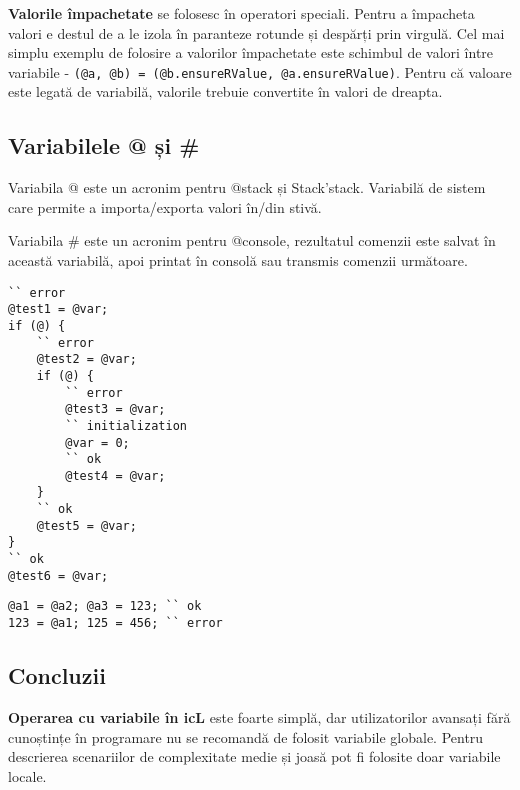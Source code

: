 {\bf Valorile împachetate} se folosesc în operatori speciali. Pentru a împacheta valori e destul de a le izola în paranteze rotunde și despărți prin virgulă. Cel mai simplu exemplu de folosire a valorilor împachetate este schimbul de valori între variabile - \lstinline|(@a, @b) = (@b.ensureRValue, @a.ensureRValue)|. Pentru că valoare este legată de variabilă, valorile trebuie convertite în valori de dreapta.

\subsection{Variabilele @ și \#}

{Variabila @} este un acronim pentru @stack și Stack'stack. Variabilă de sistem care permite a importa/exporta valori în/din stivă. 

{Variabila \#} este un acronim pentru @console, rezultatul comenzii este salvat în această variabilă, apoi printat în consolă sau transmis comenzii următoare.


\begin{lstlisting}[caption=Domeniu de vizibilitate al variabilei globale, label=globalvars]
`` error
@test1 = @var;
if (@) {
	`` error
	@test2 = @var;
	if (@) {
		`` error
		@test3 = @var;
		`` initialization
		@var = 0;
		`` ok
		@test4 = @var;
	}
	`` ok
	@test5 = @var;
}
`` ok
@test6 = @var;
\end{lstlisting}

\begin{lstlisting}[caption=Valori de stînga și dreapta, label=rlvalues]
@a1 = @a2; @a3 = 123; `` ok
123 = @a1; 125 = 456; `` error
\end{lstlisting}

\subsection{Concluzii}

{\bf Operarea cu variabile în icL} este foarte simplă, dar utilizatorilor avansați fără cunoștințe în programare nu se recomandă de folosit variabile globale. Pentru descrierea scenariilor de complexitate medie și joasă pot fi folosite doar variabile locale.
